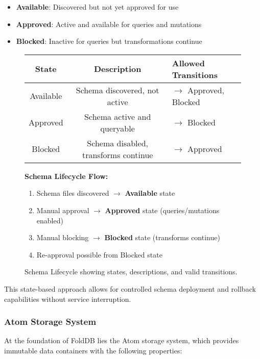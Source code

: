 \documentclass[11pt,a4paper]{article}
\begin{document}
\begin{itemize}
\item \textbf{Available}: Discovered but not yet approved for use
\item \textbf{Approved}: Active and available for queries and mutations
\item \textbf{Blocked}: Inactive for queries but transformations continue
\end{itemize}

\begin{figure}[htbp]
\centering
\begin{tabular}{|c|c|l|}
\hline
\textbf{State} & \textbf{Description} & \textbf{Allowed Transitions} \\
\hline
\hline
\rowcolor{commoncolor}
Available & Schema discovered, not active & $\rightarrow$ Approved, Blocked \\
\hline
\rowcolor{retrievalcolor}
Approved & Schema active and queryable & $\rightarrow$ Blocked \\
\hline
\rowcolor{storagecolor}
Blocked & Schema disabled, transforms continue & $\rightarrow$ Approved \\
\hline
\end{tabular}

\vspace{0.5cm}

\textbf{Schema Lifecycle Flow:}
\begin{enumerate}
\item Schema files discovered $\rightarrow$ \textbf{Available} state
\item Manual approval $\rightarrow$ \textbf{Approved} state (queries/mutations enabled)
\item Manual blocking $\rightarrow$ \textbf{Blocked} state (transforms continue)
\item Re-approval possible from Blocked state
\end{enumerate}

\caption{Schema Lifecycle showing states, descriptions, and valid transitions.}
\label{fig:schema_lifecycle}
\end{figure}

This state-based approach allows for controlled schema deployment and rollback capabilities without service interruption.

\subsubsection{Atom Storage System}
At the foundation of FoldDB lies the Atom storage system, which provides immutable data containers with the following properties:
\end{document}
